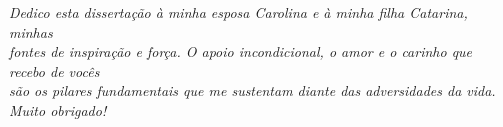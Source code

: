\begin{dedicatoria}
    \vspace*{\fill}
    \centering
    \noindent
    \textit{ Dedico esta dissertação à minha esposa Carolina e à minha filha Catarina, minhas \\
    fontes de inspiração e força. O apoio incondicional, o amor e o carinho que recebo de vocês \\ 
    são os pilares fundamentais que me sustentam diante das adversidades da vida.\\
    Muito obrigado!} \vspace*{\fill}

\end{dedicatoria}
